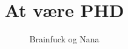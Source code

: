 \documentclass[a4paper,11pt]{article}
\title{At være PHD}
\author{Brainfuck og Nana}
\begin{document}
\maketitle

\begin{sketch}

\end{sketch}
\end{document}
